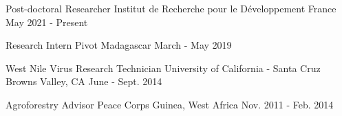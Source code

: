 

\begin{cventries}

   \cventry
    {Post-doctoral Researcher} %
    {Institut de Recherche pour le Développement} %
    {France} %
    {May 2021 - Present} %

  \cventry
    {Research Intern} %
    {Pivot} %
    {Madagascar} %
    {March - May 2019} %

  \cventry
    {West Nile Virus Research Technician} %
    {University of California - Santa Cruz} %
    {Browns Valley, CA} %
    {June - Sept. 2014} %

  \cventry
    {Agroforestry Advisor} %
    {Peace Corps} %
    {Guinea, West Africa} %
    {Nov. 2011 - Feb. 2014} %



\end{cventries}
